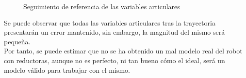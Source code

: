 \begin{itemize}
\begin{figure}[h!]
		\caption{Seguimiento de referencia de las variables articulares}
		
	\end{figure}
	
	
	
	Se puede observar que todas las variables articulares tras la trayectoria presentarán un error mantenido, sin embargo, la magnitud del mismo será pequeña.\\
	
	Por tanto, se puede estimar que no se ha obtenido un mal modelo real del robot con reductoras, aunque no es perfecto, ni tan bueno cómo el ideal, será un modelo válido para trabajar con el mismo.
	
	
	
\end{itemize}



